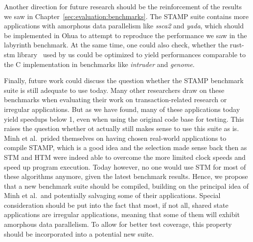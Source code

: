 Another direction for future research should be the reinforcement of the results we saw in Chapter~\ref{sec:evaluation:benchmarks}.
The STAMP suite contains more applications with amorphous data parallelism like \emph{ssca2} and \emph{yada}, which should be implemented in Ohua to attempt to reproduce the performance we saw in the labyrinth benchmark.
At the same time, one could also check, whether the rust-stm library~\cite{bergmann2020stm} used by us could be optimized to yield performances comparable to the C implementation in benchmarks like \emph{intruder} and \emph{genome}.

Finally, future work could discuss the question whether the STAMP benchmark suite is still adequate to use today.
Many other researchers draw on these benchmarks when evaluating their work on transaction-related research or irregular applications.
But as we have found, many of these applications today yield speedups below 1, even when using the original code base for testing.
This raises the question whether ot actually still makes sense to use this suite as is.
Minh et al.\ prided themselves on having chosen real-world applications to compile STAMP, which is a good idea and the selection made sense back then as STM and HTM were indeed able to overcome the more limited clock speeds and speed up program execution.
Today however, no one would use STM for most of these algorithms anymore, given the latest benchmark results.
Hence, we propose that a new benchmark suite should be compiled, building on the principal idea of Minh et al.\ and potentially salvaging some of their applications.
Special consideration should be put into the fact that most, if not all, shared state applications are irregular applications, meaning that some of them will exhibit amorphous data parallelism.
To allow for better test coverage, this property should be incorporated into a potential new suite.

